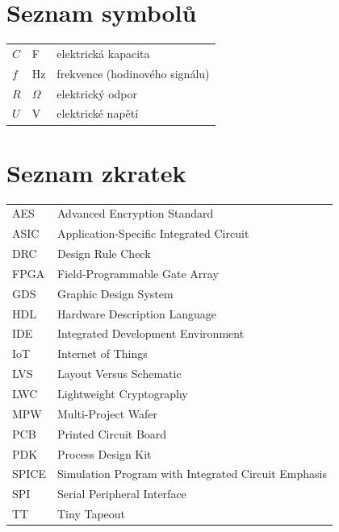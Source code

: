 \documentclass[czech,bachelor,unicode,12pt]{fee-thesis}
\theoremstyle{plain}
\theoremstyle{definition}
\theoremstyle{remark}
\numberwithin{theorem}{chapter}
\begin{document}
\chapter*{Seznam symbolů}

\begin{tabular}{p{2cm} p{2cm} l}
$C$ & F & elektrická kapacita \\
$f$ & Hz & frekvence (hodinového signálu) \\
$R$ & $\Omega$ & elektrický odpor \\
$U$ & V & elektrické napětí \\
\end{tabular}

\chapter*{Seznam zkratek}

\begin{tabular}{p{4cm} l}
AES & Advanced Encryption Standard \\
ASIC & Application-Specific Integrated Circuit \\
DRC & Design Rule Check \\
FPGA & Field-Programmable Gate Array \\
GDS & Graphic Design System \\
HDL & Hardware Description Language \\
IDE & Integrated Development Environment \\
IoT & Internet of Things \\
LVS & Layout Versus Schematic \\
LWC & Lightweight Cryptography \\
MPW & Multi-Project Wafer \\
PCB & Printed Circuit Board \\
PDK & Process Design Kit \\
SPICE & Simulation Program with Integrated Circuit Emphasis \\
SPI & Serial Peripheral Interface \\
TT & Tiny Tapeout \\
\end{tabular}

\mainmatter\mainmatterinit %

%
\end{document}
